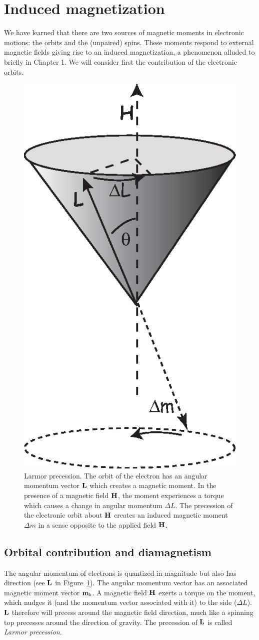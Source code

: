 {\section{Induced magnetization}  


We have learned that there are two sources of magnetic moments in electronic motions:  the orbits and the (unpaired)  spins.      These moments respond to external magnetic fields giving rise to an induced magnetization, a phenomenon alluded to briefly in Chapter 1.  We will consider first the contribution of the 
electronic orbits. 

\begin{figure}[htb]
\centering  \includegraphics[width=2 in]{EPSfiles/larmor.eps}
\caption{Larmor precession.  The orbit of the electron has an angular momentum vector ${\bf L}$ which creates a magnetic moment.  In the presence of a magnetic field $\hbox{\bf H}$, the moment experiences a torque which causes a change in angular momentum $\Delta L$.  The precession of the electronic orbit about $\hbox{\bf H}$ creates an induced magnetic moment $\Delta m$ in a sense opposite to the applied field $\hbox{\bf H}$.}
\label{fig:larmor}
\end{figure}

\subsection{Orbital contribution and diamagnetism}
\label{sect:dia}


The   angular momentum of  electrons is quantized  in magnitude but also has direction (see  ${\bf L}$ in Figure~\ref{fig:larmor}).  The angular momentum  vector has an associated magnetic moment vector $\hbox{\bf m}_b$.  A magnetic field $\hbox{\bf H}$ exerts  a torque on the moment, which nudges it (and the momentum vector associated with it)  to the side ($\Delta L$).  ${\bf L}$  therefore will  precess around the magnetic field direction, much like a spinning top precesses around the direction of gravity.  The precession of ${\bf L}$ is called 
{\it Larmor precession}.  

}
